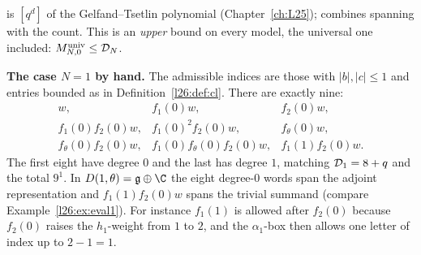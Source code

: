 \begin{dictionary}
 is $[q^d]$ of the Gelfand--Tsetlin polynomial 
(Chapter~\ref{ch:L25});  combines spanning with the count. This is an \emph{upper} bound on every
model, the universal one included: $M^{\mathrm{univ}}_{N,0}\le\mathcal D_N$.
\end{dictionary}

\textbf{The case $N=1$ by hand.} The admissible indices are those with $|b|,|c|\le1$ and entries bounded as in
Definition~\ref{l26:def:cl}. There are exactly nine:
\begin{equation*}
\begin{array}{lll}
w, & f_1(0)w, & f_2(0)w,\\
f_1(0)f_2(0)w, & f_1(0)^2f_2(0)w, & f_\theta(0)w,\\
f_\theta(0)f_2(0)w, & f_1(0)f_\theta(0)f_2(0)w, & f_1(1)f_2(0)w .
\end{array}
\end{equation*}
The first eight have degree $0$ and the last has degree $1$, matching $\mathcal D_1=8+q$ and the total $9^1$. In
$D(1,\theta)=\ltwentysixg\oplus\C$ the eight degree-$0$ words span the adjoint representation and $f_1(1)f_2(0)w$ spans the trivial
summand (compare Example~\ref{l26:ex:eval1}). For instance $f_1(1)$ is allowed after $f_2(0)$ because $f_2(0)$ raises the $h_1$-weight
from $1$ to $2$, and the $\alpha_1$-box then allows one letter of index up to $2-1=1$.

